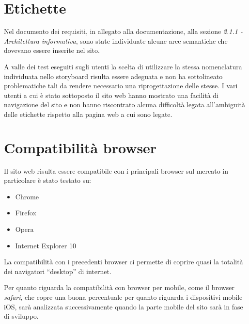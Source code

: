 \documentclass[a4paper,12pt,hidelinks]{report}
\begin{document}
\section*{Etichette}
Nel documento dei requisiti, in allegato alla documentazione, alla sezione \textit{2.1.1 - Architettura informativa}, sono state individuate alcune aree semantiche 
che dovevano essere inserite nel sito. 
\par A valle dei test eseguiti sugli utenti la scelta di utilizzare la stessa nomenclatura individuata nello storyboard risulta essere adeguata e non ha sottolineato problematiche tali da rendere necessario
una riprogettazione delle stesse. I vari utenti a cui è stato sottoposto il sito web hanno mostrato una facilità di navigazione del sito e non hanno riscontrato alcuna difficoltà legata all'ambiguità delle
etichette rispetto alla pagina web a cui sono legate.


\section*{Compatibilità browser}
Il sito web risulta essere compatibile con i principali browser sul mercato in particolare è stato testato su:
\begin{itemize}
 \item Chrome
 \item Firefox
 \item Opera
 \item Internet Explorer 10
\end{itemize}
La compatibilità con i precedenti browser ci permette di coprire quasi la totalità dei navigatori ``desktop'' di internet.
\par Per quanto riguarda la compatibilità con browser per mobile, come il browser \textit{safari}, che copre una buona percentuale per quanto riguarda i dispositivi mobile iOS, sarà analizzata successivamente
quando la parte mobile del sito sarà in fase di sviluppo.
\end{document}
